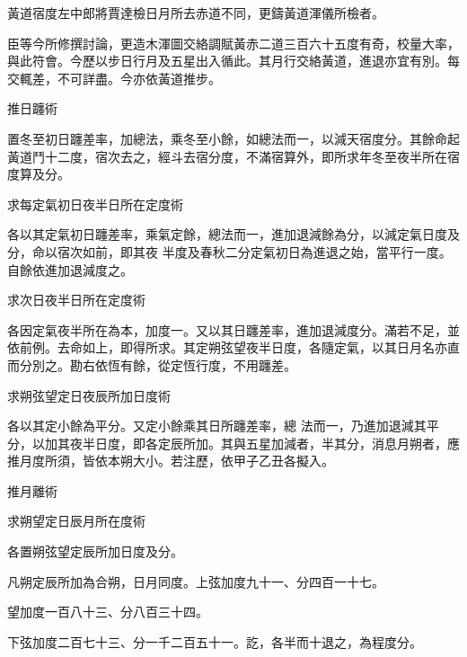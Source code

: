 \begin{pinyinscope}
 黃道宿度左中郎將賈達檢日月所去赤道不同，更鑄黃道渾儀所檢者。



 臣等今所修撰討論，更造木渾圖交絡調賦黃赤二道三百六十五度有奇，校量大率，與此符會。今歷以步日行月及五星出入循此。其月行交絡黃道，進退亦宜有別。每交輒差，不可詳盡。今亦依黃道推步。



 推日躔術



 置冬至初日躔差率，加總法，乘冬至小餘，如總法而一，以減天宿度分。其餘命起黃道鬥十二度，宿次去之，經斗去宿分度，不滿宿算外，即所求年冬至夜半所在宿度算及分。



 求每定氣初日夜半日所在定度術



 各以其定氣初日躔差率，乘氣定餘，總法而一，進加退減餘為分，以減定氣日度及分，命以宿次如前，即其夜
 半度及春秋二分定氣初日為進退之始，當平行一度。自餘依進加退減度之。



 求次日夜半日所在定度術



 各因定氣夜半所在為本，加度一。又以其日躔差率，進加退減度分。滿若不足，並依前例。去命如上，即得所求。其定朔弦望夜半日度，各隨定氣，以其日月名亦直而分別之。勘右依恆有餘，從定恆行度，不用躔差。



 求朔弦望定日夜辰所加日度術



 各以其定小餘為平分。又定小餘乘其日所躔差率，總
 法而一，乃進加退減其平分，以加其夜半日度，即各定辰所加。其與五星加減者，半其分，消息月朔者，應推月度所須，皆依本朔大小。若注歷，依甲子乙丑各擬入。



 推月離術



 求朔望定日辰月所在度術



 各置朔弦望定辰所加日度及分。



 凡朔定辰所加為合朔，日月同度。上弦加度九十一、分四百一十七。



 望加度一百八十三、分八百三十四。



 下弦加度二百七十三、分一千二百五十一。訖，各半而十退之，為程度分。




\end{pinyinscope}
